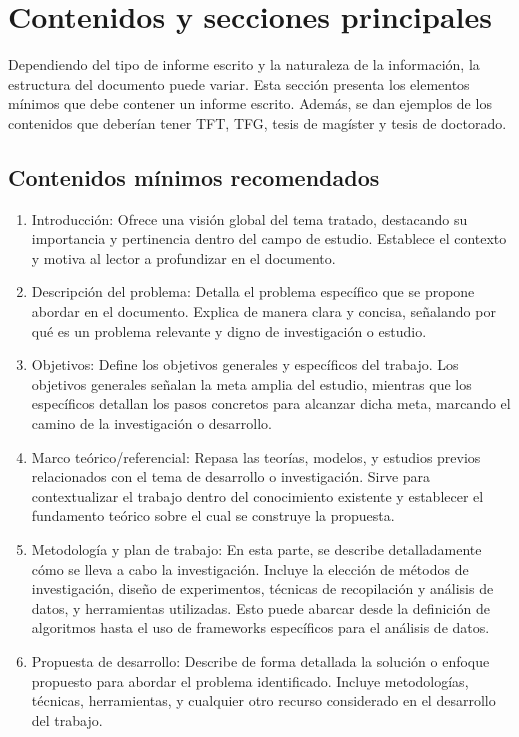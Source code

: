\chapter{Contenidos y secciones principales}
Dependiendo del tipo de informe escrito y la naturaleza de la información, la estructura del documento puede variar. Esta sección presenta los elementos mínimos que debe contener un informe escrito. Además, se dan ejemplos de los contenidos que deberían tener TFT, TFG, tesis de magíster y tesis de doctorado. 

\section{Contenidos mínimos recomendados}
\begin{enumerate}
    \item Introducción: Ofrece una visión global del tema tratado, destacando su importancia y pertinencia dentro del campo de estudio. Establece el contexto y motiva al lector a profundizar en el documento. 
    \item Descripción del problema: Detalla el problema específico que se propone abordar en el documento. Explica de manera clara y concisa, señalando por qué es un problema relevante y digno de investigación o estudio.
    \item Objetivos: Define los objetivos generales y específicos del trabajo. Los objetivos generales señalan la meta amplia del estudio, mientras que los específicos detallan los pasos concretos para alcanzar dicha meta, marcando el camino de la investigación o desarrollo. 
    \item Marco teórico/referencial: Repasa las teorías, modelos, y estudios previos relacionados con el tema de desarrollo o investigación. Sirve para contextualizar el trabajo dentro del conocimiento existente y establecer el fundamento teórico sobre el cual se construye la propuesta. 
    \item Metodología y plan de trabajo: En esta parte, se describe detalladamente cómo se lleva a cabo la investigación. Incluye la elección de métodos de investigación, diseño de experimentos, técnicas de recopilación y análisis de datos, y herramientas utilizadas. Esto puede abarcar desde la definición de algoritmos hasta el uso de frameworks específicos para el análisis de datos. 
    \item Propuesta de desarrollo: Describe de forma detallada la solución o enfoque propuesto para abordar el problema identificado. Incluye metodologías, técnicas, herramientas, y cualquier otro recurso considerado en el desarrollo del trabajo.

\end{enumerate}
